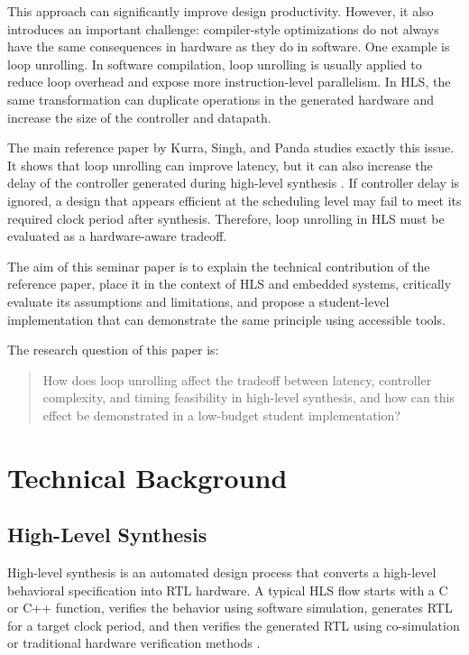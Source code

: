 \documentclass[conference]{IEEEtran}
\begin{document}
This approach can significantly improve design productivity. However, it also introduces an important challenge: compiler-style optimizations do not always have the same consequences in hardware as they do in software. One example is loop unrolling. In software compilation, loop unrolling is usually applied to reduce loop overhead and expose more instruction-level parallelism. In HLS, the same transformation can duplicate operations in the generated hardware and increase the size of the controller and datapath.

The main reference paper by Kurra, Singh, and Panda studies exactly this issue. It shows that loop unrolling can improve latency, but it can also increase the delay of the controller generated during high-level synthesis \cite{kurra2007}. If controller delay is ignored, a design that appears efficient at the scheduling level may fail to meet its required clock period after synthesis. Therefore, loop unrolling in HLS must be evaluated as a hardware-aware tradeoff.

The aim of this seminar paper is to explain the technical contribution of the reference paper, place it in the context of HLS and embedded systems, critically evaluate its assumptions and limitations, and propose a student-level implementation that can demonstrate the same principle using accessible tools.

The research question of this paper is:

\begin{quote}
How does loop unrolling affect the tradeoff between latency, controller complexity, and timing feasibility in high-level synthesis, and how can this effect be demonstrated in a low-budget student implementation?
\end{quote}

\section{Technical Background}

\subsection{High-Level Synthesis}

High-level synthesis is an automated design process that converts a high-level behavioral specification into RTL hardware. A typical HLS flow starts with a C or C++ function, verifies the behavior using software simulation, generates RTL for a target clock period, and then verifies the generated RTL using co-simulation or traditional hardware verification methods \cite{vitis2026}.
\end{document}
